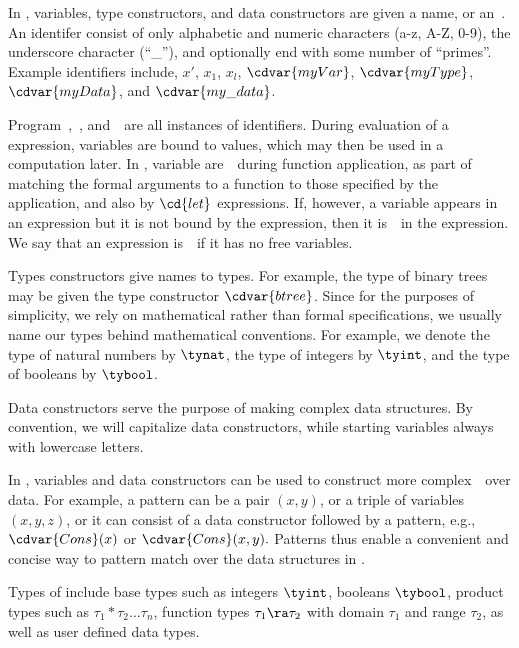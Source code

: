 \begin{gram}[Identifiers]
In \pml, variables, type constructors, and data constructors are given
a name, or an~.  
%
An identifer consist of only alphabetic and numeric characters (a-z,
A-Z, 0-9), the underscore character (``\_''), and optionally end with
some number of ``primes''.  
%
Example identifiers include, $x'$, $x_1$, $x_l$, $\cdvar{myVar}$,
$\cdvar{myType}$, $\cdvar{myData}$, and $\cdvar{my\_data}$.



Program~,~, and~~are all instances of identifiers.
%
During evaluation of a \pml expression, variables are bound to values,
which may then be used in  a computation later.  
%
In \pml, variable are~~during function application, as part
of matching the formal arguments to a function to those specified by
the application, and also by $\cd{let}$ expressions.
%
If, however, a variable appears in an expression but it is not bound
by the expression, then it is~~in the expression.
%
We say that an expression is~~if it
has no free variables.


Types constructors give names to types.  For example, the type of
binary trees may be given the type constructor $\cdvar{btree}$.
%
Since for the purposes of simplicity, we rely on mathematical rather
than formal specifications, we usually name our types behind
mathematical conventions.
%
For example, we denote the type of natural numbers by $\tynat$, the type
of integers by $\tyint$, and the type of booleans by $\tybool$.


Data constructors serve the purpose of making complex data structures.
%
By convention, we will capitalize data constructors, while starting
variables always with lowercase letters.
%
\end{gram}


\begin{gram}[Patterns]
In \pml, variables and data constructors can be used to construct more
complex~~over data.
%
For example, a pattern can be a pair $(x,y)$, or a triple of
variables $(x,y,z)$, or it can consist of a data constructor
followed by a pattern, e.g., $\cdvar{Cons}(x)$ or $\cdvar{Cons}(x,y).$
%
Patterns thus enable a convenient and concise way to pattern match
over the data structures in \pml.
\end{gram}

\begin{gram}
Types of \pml include base types such as integers $\tyint$, booleans
$\tybool$, product types such as $\tau_1 * \tau_2 \ldots \tau_n$,
function types $\tau_1 \ra \tau_2$ with domain $\tau_1$ and range
$\tau_2$, as well as user defined data types.
%
\end{gram}

